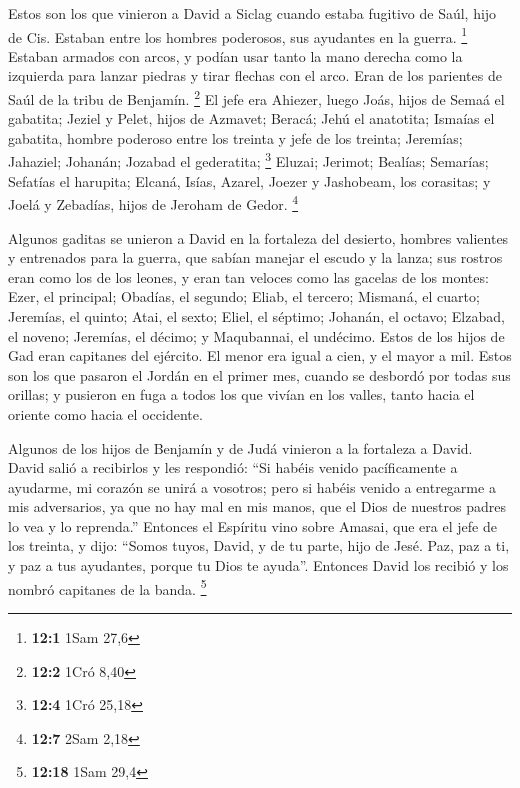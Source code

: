  Estos son los que vinieron a David a Siclag cuando estaba
fugitivo de Saúl, hijo de Cis. Estaban entre los hombres poderosos, sus
ayudantes en la guerra. \footnote{\textbf{12:1} 1Sam 27,6}
 Estaban armados con arcos, y podían usar tanto la mano
derecha como la izquierda para lanzar piedras y tirar flechas con el
arco. Eran de los parientes de Saúl de la tribu de Benjamín. \footnote{\textbf{12:2}
  1Cró 8,40}  El jefe era Ahiezer, luego Joás, hijos de
Semaá el gabatita; Jeziel y Pelet, hijos de Azmavet; Beracá; Jehú el
anatotita;  Ismaías el gabatita, hombre poderoso entre los
treinta y jefe de los treinta; Jeremías; Jahaziel; Johanán; Jozabad el
gederatita; \footnote{\textbf{12:4} 1Cró 25,18}  Eluzai;
Jerimot; Bealías; Semarías; Sefatías el harupita;  Elcaná,
Isías, Azarel, Joezer y Jashobeam, los corasitas;  y Joelá
y Zebadías, hijos de Jeroham de Gedor. \footnote{\textbf{12:7} 2Sam 2,18}

 Algunos gaditas se unieron a David en la fortaleza del
desierto, hombres valientes y entrenados para la guerra, que sabían
manejar el escudo y la lanza; sus rostros eran como los de los leones, y
eran tan veloces como las gacelas de los montes:  Ezer, el
principal; Obadías, el segundo; Eliab, el tercero; 
Mismaná, el cuarto; Jeremías, el quinto;  Atai, el sexto;
Eliel, el séptimo;  Johanán, el octavo; Elzabad, el
noveno;  Jeremías, el décimo; y Maqubannai, el undécimo.
 Estos de los hijos de Gad eran capitanes del ejército.
El menor era igual a cien, y el mayor a mil.  Estos son
los que pasaron el Jordán en el primer mes, cuando se desbordó por todas
sus orillas; y pusieron en fuga a todos los que vivían en los valles,
tanto hacia el oriente como hacia el occidente.

 Algunos de los hijos de Benjamín y de Judá vinieron a la
fortaleza a David.  David salió a recibirlos y les
respondió: ``Si habéis venido pacíficamente a ayudarme, mi corazón se
unirá a vosotros; pero si habéis venido a entregarme a mis adversarios,
ya que no hay mal en mis manos, que el Dios de nuestros padres lo vea y
lo reprenda.''  Entonces el Espíritu vino sobre Amasai,
que era el jefe de los treinta, y dijo: ``Somos tuyos, David, y de tu
parte, hijo de Jesé. Paz, paz a ti, y paz a tus ayudantes, porque tu
Dios te ayuda''. Entonces David los recibió y los nombró capitanes de la
banda. \footnote{\textbf{12:18} 1Sam 29,4}

